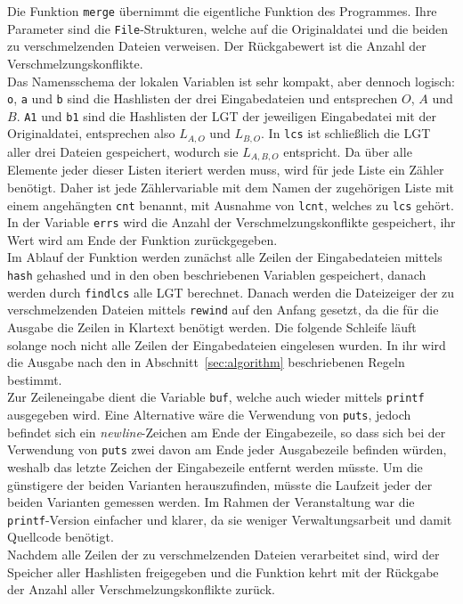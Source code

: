 \documentclass[a4paper,titlepage,12pt]{scrartcl}
\begin{document}
Die Funktion \texttt{merge} übernimmt die eigentliche Funktion des Programmes.
Ihre Parameter sind die \texttt{File}-Strukturen,
welche auf die Originaldatei und die beiden zu verschmelzenden Dateien verweisen.
Der Rückgabewert ist die Anzahl der Verschmelzungskonflikte.
\\
Das Namensschema der lokalen Variablen ist sehr kompakt,
aber dennoch logisch:
\texttt{o}, \texttt{a} und \texttt{b} sind die Hashlisten der drei Eingabedateien und entsprechen $O$, $A$ und $B$.
\texttt{A1} und \texttt{b1} sind die Hashlisten der LGT der jeweiligen Eingabedatei mit der Originaldatei,
entsprechen also $L_{A,O}$ und $L_{B,O}$.
In \texttt{lcs} ist schließlich die LGT aller drei Dateien gespeichert,
wodurch sie $L_{A,B,O}$ entspricht.
Da über alle Elemente jeder dieser Listen iteriert werden muss,
wird für jede Liste ein Zähler benötigt.
Daher ist jede Zählervariable mit dem Namen der zugehörigen Liste mit einem angehängten \texttt{cnt} benannt,
mit Ausnahme von \texttt{lcnt},
welches zu \texttt{lcs} gehört.
In der Variable \texttt{errs} wird die Anzahl der Verschmelzungskonflikte gespeichert,
ihr Wert wird am Ende der Funktion zurückgegeben.
\\
Im Ablauf der Funktion werden zunächst alle Zeilen der Eingabedateien mittels \texttt{hash} gehashed und in den oben beschriebenen Variablen gespeichert,
danach werden durch \texttt{findlcs} alle LGT berechnet.
Danach werden die Dateizeiger der zu verschmelzenden Dateien mittels \texttt{rewind} auf den Anfang gesetzt,
da die für die Ausgabe die Zeilen in Klartext benötigt werden.
Die folgende Schleife läuft solange noch nicht alle Zeilen der Eingabedateien eingelesen wurden.
In ihr wird die Ausgabe nach den in Abschnitt~\ref{sec:algorithm} beschriebenen Regeln bestimmt.
\\
Zur Zeileneingabe dient die Variable \texttt{buf},
welche auch wieder mittels \texttt{printf} ausgegeben wird.
Eine Alternative wäre die Verwendung von \texttt{puts},
jedoch befindet sich ein \emph{newline}-Zeichen am Ende der Eingabezeile,
so dass sich bei der Verwendung von \texttt{puts} zwei davon am Ende jeder Ausgabezeile befinden würden,
weshalb das letzte Zeichen der Eingabezeile entfernt werden müsste.
Um die günstigere der beiden Varianten herauszufinden,
müsste die Laufzeit jeder der beiden Varianten gemessen werden.
Im Rahmen der Veranstaltung war die \texttt{printf}-Version einfacher und klarer,
da sie weniger Verwaltungsarbeit und damit Quellcode benötigt.
\\
Nachdem alle Zeilen der zu verschmelzenden Dateien verarbeitet sind,
wird der Speicher aller Hashlisten freigegeben und die Funktion kehrt mit der Rückgabe der Anzahl aller Verschmelzungskonflikte zurück.
\end{document}
